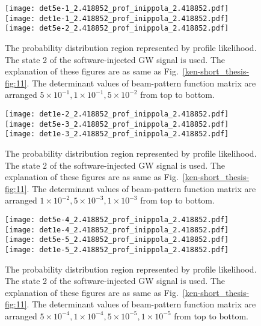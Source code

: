 \documentclass[%
 aps,
 prd,
 amsmath,amssymb,
 reprint,%
superscriptaddress
]{revtex4-1}
\begin{document}
\begin{figure*}[tb]
  \centering
   \texttt{[image: det5e-1\_2.418852\_prof\_inippola\_2.418852.pdf]}
 \texttt{[image: det1e-1\_2.418852\_prof\_inippola\_2.418852.pdf]}
    \texttt{[image: det5e-2\_2.418852\_prof\_inippola\_2.418852.pdf]}
   \caption{The probability distribution region represented by profile likelihood. The state 2 of the software-injected GW signal is used. The explanation of these figures are as same as Fig.~\ref{ken-short_thesis-fig:11}. The determinant values of beam-pattern function matrix are arranged $5\times10^{-1}, 1\times10^{-1}, 5\times10^{-2}$ from top to bottom.\label{ken-short_thesis-fig:23}}
\end{figure*}


\begin{figure*}[htbp]
 \centering
  \texttt{[image: det1e-2\_2.418852\_prof\_inippola\_2.418852.pdf]}
    \texttt{[image: det5e-3\_2.418852\_prof\_inippola\_2.418852.pdf]}
 \texttt{[image: det1e-3\_2.418852\_prof\_inippola\_2.418852.pdf]}
    \caption{The probability distribution region represented by profile likelihood. The state 2 of the software-injected GW signal is used. The explanation of these figures are as same as Fig.~\ref{ken-short_thesis-fig:11}. The determinant values of beam-pattern function matrix are arranged $1\times10^{-2}, 5\times10^{-3}, 1\times10^{-3}$ from top to bottom.\label{ken-short_thesis-fig:24}}
\end{figure*}


\begin{figure*}[htbp]
  \centering
    \texttt{[image: det5e-4\_2.418852\_prof\_inippola\_2.418852.pdf]}
 \texttt{[image: det1e-4\_2.418852\_prof\_inippola\_2.418852.pdf]}
    \texttt{[image: det5e-5\_2.418852\_prof\_inippola\_2.418852.pdf]}
 \texttt{[image: det1e-5\_2.418852\_prof\_inippola\_2.418852.pdf]}
    \caption{The probability distribution region represented by profile likelihood. The state 2 of the software-injected GW signal is used. The explanation of these figures are as same as Fig.~\ref{ken-short_thesis-fig:11}. The determinant values of beam-pattern function matrix are arranged $5\times10^{-4}, 1\times10^{-4}, 5\times10^{-5}, 1\times10^{-5}$ from top to bottom.\label{ken-short_thesis-fig:25}}
\end{figure*}
\end{document}
